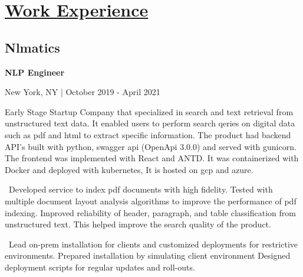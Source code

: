 \documentclass{article}
\begin{document}
\begin{minipage}[t][0pt]{8in\linewidth}
\begin{minipage}[t]{0.45\textwidth\hspace{0in}}
    \section{\underline{Work Experience}}
        \vspace{-0.8em}
        \subsection{Nlmatics}
        \vspace{-0.5em}\hspace{0.1em}
        \mdseries\bfseries{NLP Engineer}
        \vspace{0.1em}
        
        \hspace{0.5em}\mdseries\textrm{New York, NY | October 2019 - April 2021}

        \vspace{-0.8em}
        \begin{minipage}[t]{3.75in\textwidth\hspace{0in}}
            
            \vspace{0.3em}
            {Early Stage Startup Company that specialized in search and text retrieval from unstructured text data. It enabled users to perform search qeries on digital data such as pdf and html to extract specific information. The product had backend API's built with python, swagger api (OpenApi 3.0.0) and served with gunicorn. The frontend was implemented with React and ANTD. It was containerized with Docker and deployed with kubernetes, It is hosted on gcp and azure.}

            \vspace{0.3em}
            \hspace{1em}\textasteriskcentered \, \mdseries\textrm{Developed service to index pdf documents with high fidelity. Tested with multiple document layout analysis algorithms to improve the performance of pdf indexing. Improved reliability of header, paragraph, and table classification from unstructured text. This helped improve the search quality of the product.}
            
            \vspace{0.3em}
            \hspace{1em}\textasteriskcentered \, \mdseries\textrm{Lead on-prem installation for clients and customized deployments for restrictive environments. Prepared installation by simulating client environment Designed deployment scripts for regular updates and roll-outs.}


\end{minipage}
\end{minipage}
\end{minipage}
\end{document}

